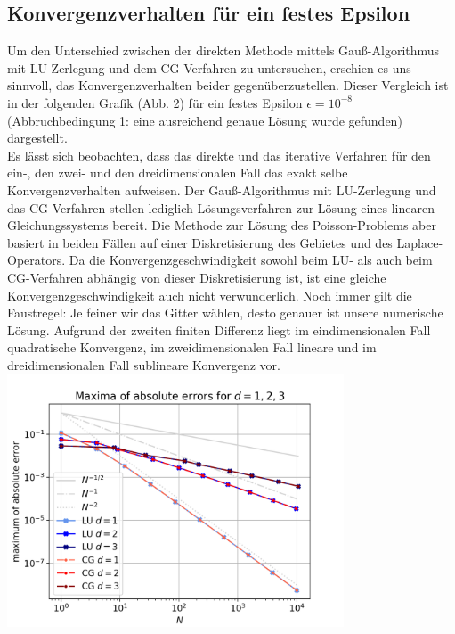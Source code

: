 \documentclass{scrartcl}
\begin{document}
\subsection{Konvergenzverhalten für ein festes Epsilon}
Um den Unterschied zwischen der direkten Methode mittels Gauß-Algorithmus mit LU-Zerlegung und dem CG-Verfahren zu untersuchen, erschien es uns sinnvoll, das Konvergenzverhalten beider gegenüberzustellen.
Dieser Vergleich ist in der folgenden Grafik (Abb. 2) für ein festes Epsilon $\epsilon = 10^{-8}$ (Abbruchbedingung 1: eine ausreichend genaue Lösung wurde gefunden) dargestellt. \\
Es lässt sich beobachten, dass das direkte und das iterative Verfahren für den ein-, den zwei- und den dreidimensionalen Fall das exakt selbe Konvergenzverhalten aufweisen.
Der Gauß-Algorithmus mit LU-Zerlegung und das CG-Verfahren stellen lediglich Lösungsverfahren zur Lösung eines linearen Gleichungssystems bereit.
Die Methode zur Lösung des Poisson-Problems aber basiert in beiden Fällen auf einer Diskretisierung des Gebietes und des Laplace-Operators.
Da die Konvergenzgeschwindigkeit sowohl beim LU- als auch beim CG-Verfahren abhängig von dieser Diskretisierung ist, ist eine gleiche Konvergenzgeschwindigkeit auch nicht verwunderlich.
Noch immer gilt die Faustregel: Je feiner wir das Gitter wählen, desto genauer ist unsere numerische Lösung.
Aufgrund der zweiten finiten Differenz liegt im eindimensionalen Fall quadratische Konvergenz, im zweidimensionalen Fall lineare und im dreidimensionalen Fall sublineare Konvergenz vor. \\


{
  \centering
    \includegraphics[width=0.75\textwidth]{Grafiken/compare}
    \vspace{-0.2cm}
}
\vspace{0.5cm}
\end{document}
